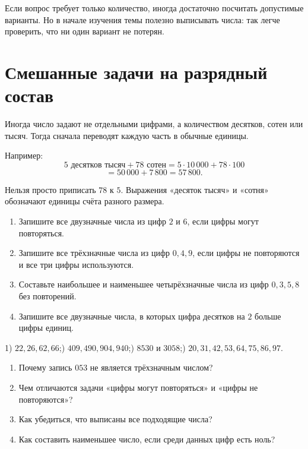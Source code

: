\begin{notebox}
  Если вопрос требует только количество, иногда достаточно посчитать
  допустимые варианты. Но в начале изучения темы полезно выписывать числа:
  так легче проверить, что ни один вариант не потерян.
\end{notebox}

\section{Смешанные задачи на разрядный состав}

Иногда число задают не отдельными цифрами, а количеством десятков, сотен
или тысяч. Тогда сначала переводят каждую часть в обычные единицы.

Например:
\[
  5\text{ десятков тысяч}+78\text{ сотен}
  =5\cdot10\,000+78\cdot100
\]
\[
  =50\,000+7\,800=57\,800.
\]

\begin{warningbox}
  Нельзя просто приписать \(78\) к \(5\). Выражения «десяток тысяч» и
  «сотня» обозначают единицы счёта разного размера.
\end{warningbox}

\begin{practicebox}
  \begin{enumerate}
    \item Запишите все двузначные числа из цифр \(2\) и \(6\), если цифры
      могут повторяться.
    \item Запишите все трёхзначные числа из цифр \(0,4,9\), если цифры не
      повторяются и все три цифры используются.
    \item Составьте наибольшее и наименьшее четырёхзначные числа из цифр
      \(0,3,5,8\) без повторений.
    \item Запишите все двузначные числа, в которых цифра десятков на \(2\)
      больше цифры единиц.
  \end{enumerate}
\end{practicebox}

\begin{notebox}[Ответы]
  1) \(22,26,62,66\);) \(409,490,904,940\);) \(8530\) и \(3058\);) \(20,31,42,53,64,75,86,97\).
\end{notebox}

\begin{questionsbox}
  \begin{enumerate}
    \item Почему запись \(053\) не является трёхзначным числом?
    \item Чем отличаются задачи «цифры могут повторяться» и «цифры не
      повторяются»?
    \item Как убедиться, что выписаны все подходящие числа?
    \item Как составить наименьшее число, если среди данных цифр есть ноль?
  \end{enumerate}
\end{questionsbox}
